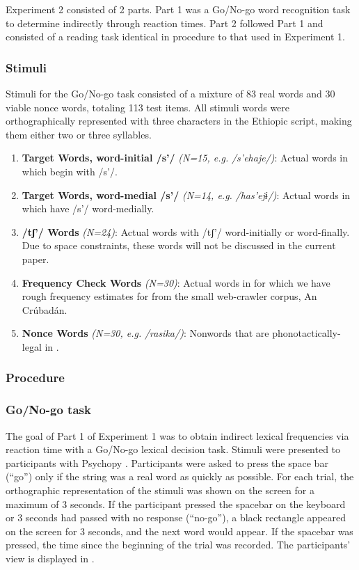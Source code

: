 \documentclass[output=paper,newtxmath,modfonts,nonflat,final]{langsci/langscibook}
\begin{document}
Experiment 2 consisted of 2 parts. Part 1 was a Go/No-go word recognition task to determine  indirectly through reaction times. Part 2 followed Part 1 and consisted of a reading task identical in procedure to that used in Experiment 1.



\subsubsection{Stimuli}\label{sec:moeng:6.1.1}

Stimuli for the Go/No-go task consisted of a mixture of 83 real  words and 30 viable nonce words, totaling 113 test items. All stimuli words were orthographically represented with three characters in the Ethiopic script, making them either two or three syllables. 

\begin{enumerate}
\item {\textbf{Target Words, word-initial /s’/} \textit{(N=15, e.g.}  \textit{/s’ehaje/)}: Actual words in  which begin with /s’/.}
\item {\textbf{Target Words, word-medial /s’/} \textit{(N=14, e.g.}  \textit{/has’ejɨ}\textit{/)}: Actual words in  which have /s’/ word-medially.}
\item {\textbf{/tʃ’/ Words} \textit{(N=24)}: Actual words with /tʃ’/ word-initially or word-finally. Due to space constraints, these words will not be discussed in the current paper.}
\item {\textbf{Frequency Check Words} \textit{(N=30)}: Actual words in  for which we have rough frequency estimates for from the small web-crawler corpus, An Crúbadán.}
\item {\textbf{Nonce Words} \textit{(N=30, e.g.}  \textit{/rasika/)}: Nonwords that are phonotactically-legal in .} 
\end{enumerate}

\subsubsection{Procedure}\label{sec:moeng:6.1.2}
\subsubsection{Go/No-go task}\label{sec:moeng:6.1.2.1}

The goal of Part 1 of Experiment 1 was to obtain indirect lexical frequencies via reaction time with a Go/No-go lexical decision task. Stimuli were presented to participants with Psychopy \citep{peirce2007psychopy}. Participants were asked to press the space bar (“go”) only if the string was a real word as quickly as possible. For each trial, the orthographic representation of the stimuli was shown on the screen for a maximum of 3 seconds. If the participant pressed the spacebar on the keyboard or 3 seconds had passed with no response (“no-go”), a black rectangle appeared on the screen for 3 seconds, and the next word would appear. If the spacebar was pressed, the time since the beginning of the trial was recorded. The participants’ view is displayed in .
\end{document}
